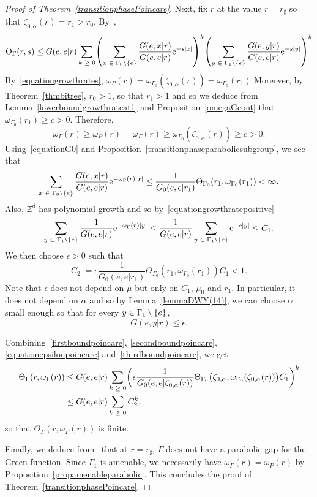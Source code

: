\documentclass[10pt]{amsart}
\theoremstyle{definition}\newtheorem{defi}[theo]{Definition}\newtheorem{rema}[theo]{Remark}\newtheorem{exam}[theo]{Example}\newtheorem{exem}[theo]{Example}\newtheorem{nota}[theo]{Notation}
\newcommand{\Z}{\mathbb{Z}}
\newcommand{\rme}{\mathrm{e}}
\let\originalleft\left
\let\originalright\right
\renewcommand{\left}{\mathopen{}\mathclose\bgroup\originalleft}
\renewcommand{\right}{\aftergroup\egroup\originalright}
\let\oldin\in
\renewcommand{\in}{\mathchoice{\oldin}{\oldin}{\,\oldin\,}{\,\oldin\,}}
\let\oldge\ge
\renewcommand{\ge}{\mathchoice{\oldge}{\oldge}{\,\oldge\,}{\,\oldge\,}}
\begin{document}
\begin{proof}[{Proof of Theorem~\ref{transitionphasePoincare}}]
Next, fix $r$ at the value $r=r_\sharp$ so that $\zeta_{0,\alpha}(r)=r_1>r_0$. By~\cite[(15)]{DWY},
\[
\Theta_{\Gamma}(r,s)\leq G(e,e|r)\sum_{k\ge 0}\left (\sum_{x\in \Gamma_0\setminus\{e\}}\frac{G(e,x|r)}{G(e,e|r)}\rme^{-s|x|}\right)^k\left (\sum_{y\in \Gamma_1\setminus\{e\}}\frac{G(e,y|r)}{G(e,e|r)}\rme^{-s|y|}\right)^k
\]
By~\eqref{equationgrowthrates}, $\omega_P(r)=\omega_{\Gamma_0}(\zeta_{0,\alpha}(r))=\omega_{\Gamma_0}(r_1)$ Moreover, by Theorem~\ref{thmbitree}, $r_0>1$, so that $r_1>1$ and so we deduce from Lemma~\ref{lowerboundgrowthrateat1} and Proposition~\ref{omegaGcont} that $\omega_{\Gamma_0}(r_1)\geq c>0$. Therefore,
\begin{equation}\label{equationgrowthratepositive}
\omega_{\Gamma}(r)\geq \omega_P(r) = \omega_{\Gamma}(r)\geq \omega_{\Gamma_0}(\zeta_{0,\alpha}(r)) \geq c>0.
\end{equation}
Using~\eqref{equationG0} and Proposition~\ref{transitionphaseparabolicsubgroup}, we see that
\begin{equation}\label{firstboundpoincare}
\sum_{x\in \Gamma_0\setminus\{e\}}\frac{G(e,x|r)}{G(e,e|r)}\rme^{-\omega_\Gamma(r)|x|}\leq \frac{1}{G_0(e,e|r_1)}\Theta_{\Gamma_0}(r_1,\omega_{\Gamma_0}(r_1))
<\infty.
\end{equation}
Also, $\Z^d$ has polynomial growth and so by~\eqref{equationgrowthratepositive}
\begin{equation}\label{secondboundpoincare}
\sum_{y\in \Gamma_1\setminus\{e\}}\frac{1}{G(e,e|r)}\rme^{-\omega_\Gamma(r)|y|}\leq \frac{1}{G(e,e|r)}\sum_{y\in \Gamma_1\setminus\{e\}}\rme^{-c|y|}\leq C_1.
\end{equation}
We then choose $\epsilon>0$ such that
\begin{equation}\label{equationepsilonpoincare}
C_2:=\epsilon\frac{1}{G_0(e,e|r_1)}\Theta_{\Gamma_0}(r_1,\omega_{\Gamma_0}(r_1))C_1<1.
\end{equation}
Note that $\epsilon$ does not depend on $\mu$ but only on $C_1$, $\mu_0$ and $r_1$. In particular, it does not depend on $\alpha$ and so by Lemma~\ref{lemmaDWY(14)}, we can choose $\alpha$ small enough so that for every $y\in \Gamma_1\setminus \{e\}$,
\[
G(e,y|r)\leq \epsilon.
\]


Combining~\eqref{firstboundpoincare}, \eqref{secondboundpoincare}, \eqref{equationepsilonpoincare} and~\eqref{thirdboundpoincare}, we get
\begin{align*}
\Theta_{\Gamma}(r,\omega_\Gamma(r))&\leq G(e,e|r)\sum_{k\ge 0}\left(\epsilon\frac{1}{G_0(e,e|\zeta_{0,\alpha}(r))}\Theta_{\Gamma_0}\bigl(\zeta_{0,\alpha},\omega_{\Gamma_0}(\zeta_{0,\alpha}(r))\bigr)C_1\right)^k\\
&\leq G(e,e|r)\sum_{k\ge 0}C_2^k,
\end{align*}
so that $\Theta_{\Gamma}(r,\omega_\Gamma(r))$ is finite.

Finally, we deduce from~\cite[Lemma~3.7]{DWY} that at $r=r_\sharp$, $\Gamma$ does not have a parabolic gap for the Green function. Since $\Gamma_1$ is amenable, we necessarily have $\omega_\Gamma(r)=\omega_P(r)$ by Proposition~\ref{propamenableparabolic}. This concludes the proof of Theorem~\ref{transitionphasePoincare}.
\end{proof}
\end{document}
